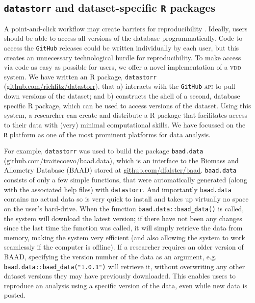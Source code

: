 \documentclass[a4paper,11pt]{article}
\newcommand{\smurl}[1]{{\footnotesize\url{#1}}}
\begin{document}
\subsection{\texttt{datastorr} and dataset-specific \texttt{R} packages}

A point-and-click workflow may create barriers for reproducibility \cite{Wilson-2014,Lowndes-2017}. Ideally, users should be able to access all versions of the database programmatically. Code to access the \texttt{GitHub} releases could be written individually by each user, but this creates an unnecessary technological hurdle for reproducibility.  To make access via code as easy as possible for users, we offer a novel implementation of a \textsc{vdd} system. We have written an \textsc{R} package, \texttt{datastorr} (\smurl{github.com/richfitz/datastorr}), that a) interacts with the \texttt{GitHub} \textsc{api} to pull down versions of the dataset; and b) constructs the shell of a second, database specific \textsc{R} package, which can be used to access versions of the dataset. Using this system, a researcher can create and distribute a \textsc{R} package that facilitates access to their data with (very) minimal computational skills. We have focussed on the \texttt{R} platform \cite{R-2017} as one of the most prominent platforms for data analysis.

For example, \texttt{datastorr} was used to build the package \texttt{baad.data} (\smurl{github.com/traitecoevo/baad.data}), which is an interface to the Biomass and Allometry Database (\textsc{BAAD}) \cite{Falster-2015} stored at \smurl{github.com/dfalster/baad}. \texttt{baad.data} consists of only a few simple functions, that were automatically generated (along with the associated help files) with \texttt{datastorr}. And importantly \texttt{baad.data} contains no actual data so is very quick to install and takes up virtually no space on the user's hard-drive.
When the function \texttt{baad.data::baad\_data()} is called, the system will download the latest version; if there have not been any changes since the last time the function was called, it will simply retrieve the data from memory, making the system very efficient (and also allowing the system to work seamlessly if the computer is offline). If a researcher requires an older version of \textsc{BAAD}, specifying the version number of the data as an argument, e.g. \texttt{baad.data::baad\_data("1.0.1")} will retrieve it, without overwriting any other dataset versions they may have previously downloaded. This enables users to reproduce an analysis using a specific version of the data, even while new data is posted.
\end{document}
